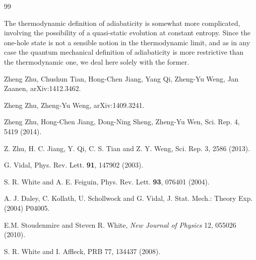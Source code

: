 \documentclass[aps,prb,twocolumn]{revtex4}
\begin{document}
\begin{thebibliography}{99}

  The thermodynamic definition of adiabaticity is somewhat more
complicated, involving the possibility of a quasi-static evolution at constant
entropy.  Since the one-hole state is not a sensible notion in the
thermodynamic limit, and as in any case the quantum mechanical definition of
adiabaticity is more restrictive than the thermodynamic one, we  deal here
solely with the former. 

  Zheng Zhu, Chushun Tian, Hong-Chen Jiang, Yang Qi, Zheng-Yu Weng, Jan Zaanen, arXiv:1412.3462.

  Zheng Zhu, Zheng-Yu Weng, arXiv:1409.3241.

 Zheng Zhu, Hong-Chen Jiang, Dong-Ning Sheng, Zheng-Yu Wen,  Sci. Rep. 4, 5419 (2014).

  Z. Zhu, H. C. Jiang, Y. Qi, C. S. Tian and Z. Y. Weng, Sci. Rep. 3, 2586 (2013).

 G. Vidal, Phys. Rev. Lett. {\bf 91}, 147902 (2003).

 S. R. White and A. E. Feiguin, Phys. Rev. Lett. {\bf 93}, 076401 (2004).

 A. J. Daley, C. Kollath, U. Schollwock and G. Vidal, J. Stat. Mech.: Theory Exp. (2004) P04005.

 E.M. Stoudenmire and Steven R. White,
{\sl New Journal of Physics} 12, 055026 (2010).

 S. R. White and I. Affleck, PRB 77, 134437 (2008).

\end{thebibliography}

\end{document}
